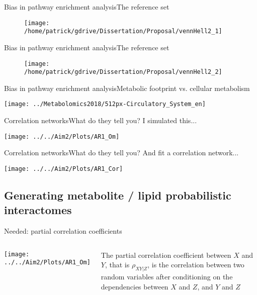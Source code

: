 \documentclass[xcolor=dvipsnames]{beamer}
\begin{document}
\begin{frame}{Bias in pathway enrichment analysis}{The reference set}
	\vspace{-15.5pt}
	\begin{figure}
		\texttt{[image: /home/patrick/gdrive/Dissertation/Proposal/vennHell2\_1]}
	\end{figure}
\end{frame}

\begin{frame}{Bias in pathway enrichment analysis}{The reference set}
	\vspace{-15.5pt}
	\begin{figure}
		\texttt{[image: /home/patrick/gdrive/Dissertation/Proposal/vennHell2\_2]}
	\end{figure}
\end{frame}

\begin{frame}{Bias in pathway enrichment analysis}{Metabolic footprint vs. cellular metabolism}
\vspace{-10.5pt}
	\begin{center}
		\texttt{[image: ../Metabolomics2018/512px-Circulatory\_System\_en]}
	\end{center}
\end{frame}

\begin{frame}{Correlation networks}{What do they tell you?}
	{I simulated this...}
	\begin{center}
		\texttt{[image: ../../Aim2/Plots/AR1\_Om]}
	\end{center}
\end{frame}

\begin{frame}{Correlation networks}{What do they tell you?}
	{And fit a correlation network...}
	\begin{center}
		\texttt{[image: ../../Aim2/Plots/AR1\_Cor]}
	\end{center}
\end{frame}

\subsection{Generating metabolite / lipid probabilistic interactomes}

\begin{frame}{Needed: partial correlation coefficients}
\begin{columns}
	\vspace{-15 pt}
	\begin{center}
		\texttt{[image: ../../Aim2/Plots/AR1\_Om]}
	\end{center}
 The partial correlation coefficient between $X$ and $Y$, that is $\rho_{XY|Z}$, is the correlation between two random variables after conditioning on the dependencies between $X$ and $Z$, and $Y$ and $Z$ 
\end{columns}
\end{frame}
\end{document}

